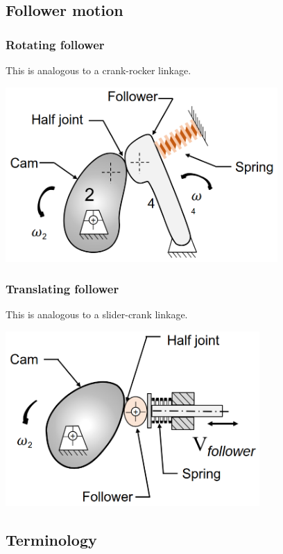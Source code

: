 \documentclass[11pt]{article}
\begin{document}
\subsection{Follower motion}
\label{sec:org7c42590}

\subsubsection{Rotating follower}
\label{sec:org7d06294}
This is analogous to a crank-rocker linkage.
\begin{center}
\includegraphics[height=18em]{./images/force-closure-diagram.png}
\end{center}
\subsubsection{Translating follower}
\label{sec:org8196b91}
This is analogous to a slider-crank linkage.
\begin{center}
\includegraphics[height=18em]{./images/translating-follower-diagram.png}
\end{center}
\subsection{Terminology}
\label{sec:orge4d956a}
\end{document}

